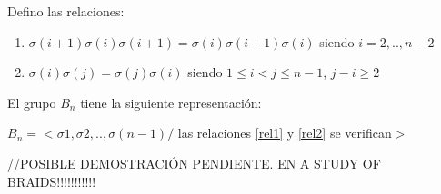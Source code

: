 \documentclass[14pt]{extarticle}
\begin{document}
	\begin{teo}	    \label{teoBn}
	    Defino las relaciones:
	    \begin{enumerate}
	    	\item $ \sigma(i+1)\sigma(i)\sigma(i+1) =\sigma(i)\sigma(i+1)\sigma(i) $ siendo $i=2,..,n-2 $ \label{rel1}
	    	\item $ \sigma(i)\sigma(j)=\sigma(j)\sigma(i) $ siendo $1 \le i < j \le n-1 $, $j-i \geq 2$	 \label{rel2}   	
	    \end{enumerate}
	    El grupo $B_{n}$ tiene la siguiente representación:
        \begin{center}
			$B_{n} = <\sigma1, \sigma2,..,\sigma(n-1) /$ las relaciones \ref{rel1} y \ref{rel2} se verifican$>$
        \end{center}
	   
	\end{teo}
	//POSIBLE DEMOSTRACIÓN PENDIENTE. EN A STUDY OF BRAIDS!!!!!!!!!!!\\
	
\end{document}
